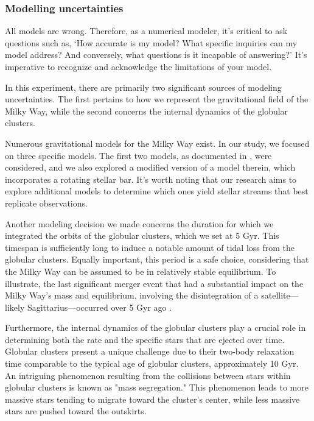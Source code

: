 \subsubsection*{Modelling uncertainties}
All models are wrong. Therefore, as a numerical modeler, it's critical to ask questions such as, `How accurate is my model? What specific inquiries can my model address? And conversely, what questions is it incapable of answering?' It's imperative to recognize and acknowledge the limitations of your model.

In this experiment, there are primarily two significant sources of modeling uncertainties. The first pertains to how we represent the gravitational field of the Milky Way, while the second concerns the internal dynamics of the globular clusters.

Numerous gravitational models for the Milky Way exist. In our study, we focused on three specific models. The first two models, as documented in \citep{2017A&A...598A..66P}, were considered, and we also explored a modified version of a model therein, which incorporates a rotating stellar bar. It's worth noting that our research aims to explore additional models to determine which ones yield stellar streams that best replicate observations.

Another modeling decision we made concerns the duration for which we integrated the orbits of the globular clusters, which we set at 5 Gyr. This timespan is sufficiently long to induce a notable amount of tidal loss from the globular clusters. Equally important, this period is a safe choice, considering that the Milky Way can be assumed to be in relatively stable equilibrium. To illustrate, the last significant merger event that had a substantial impact on the Milky Way's mass and equilibrium, involving the disintegration of a satellite—likely Sagittarius—occurred over 5 Gyr ago \citep{2020MNRAS.498.2472K}.

Furthermore, the internal dynamics of the globular clusters play a crucial role in determining both the rate and the specific stars that are ejected over time. Globular clusters present a unique challenge due to their two-body relaxation time comparable to the typical age of globular clusters, approximately 10 Gyr. An intriguing phenomenon resulting from the collisions between stars within globular clusters is known as "mass segregation." This phenomenon leads to more massive stars tending to migrate toward the cluster's center, while less massive stars are pushed toward the outskirts.

